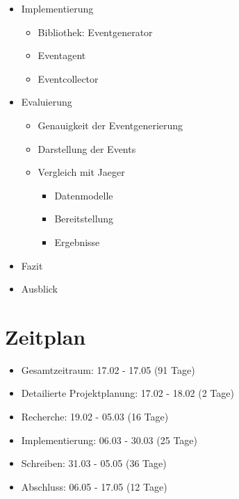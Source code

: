 \documentclass[a4paper]{article}
\begin{document}
\begin{itemize}
\begin{itemize}
	\end{itemize}
	\item Implementierung
	\begin{itemize}
		\item Bibliothek: Eventgenerator
		\item Eventagent
		\item Eventcollector
	\end{itemize}
	\item Evaluierung
	\begin{itemize}
		\item Genauigkeit der Eventgenerierung
		\item Darstellung der Events
		\item Vergleich mit Jaeger
		\begin{itemize}
			\item Datenmodelle
			\item Bereitstellung
			\item Ergebnisse
		\end{itemize}
	\end{itemize}
	\item Fazit
	\item Ausblick
\end{itemize}

\section{Zeitplan}
\begin{itemize}
\item		Gesamtzeitraum: 17.02 - 17.05 (91 Tage)

\item		Detailierte Projektplanung: 17.02 - 18.02 (2 Tage)
\item		Recherche: 19.02 - 05.03 (16 Tage)
\item		Implementierung: 06.03 - 30.03 (25 Tage)
\item		Schreiben:  31.03 - 05.05 (36 Tage)
\item		Abschluss: 06.05 - 17.05 (12 Tage)


\end{itemize}
\newpage
\printbibliography[title=Literaturverzeichnis]
\end{document}
